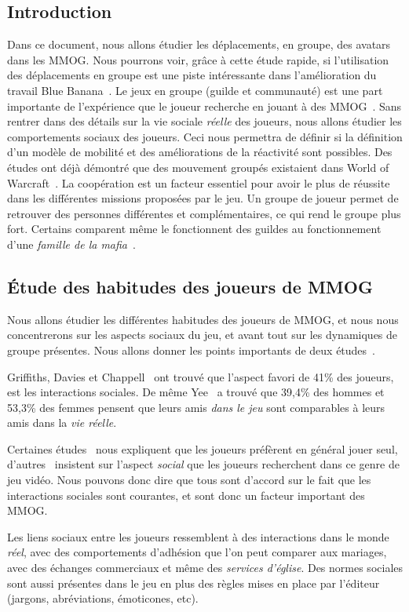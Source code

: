 
\subsection{Introduction}
Dans ce document, nous allons étudier les déplacements, en groupe, des avatars dans les MMOG. Nous pourrons voir, grâce à cette étude rapide, si l'utilisation des déplacements en groupe est une piste intéressante dans l'amélioration du travail Blue Banana~\cite{191}. Le jeux en groupe (guilde et communauté) est une part importante de l'expérience que le joueur recherche en jouant à des MMOG~\cite{1501834,1255052}. Sans rentrer dans des détails sur la vie sociale \textit{réelle} des joueurs, nous allons étudier les comportements sociaux des joueurs. Ceci nous permettra de définir si la définition d'un modèle de mobilité et des améliorations de la réactivité sont possibles. Des études ont déjà démontré que des mouvement groupés existaient dans World of Warcraft~\cite{15141312}. La coopération est un facteur essentiel pour avoir le plus de réussite  dans les différentes missions proposées par le jeu. Un groupe de joueur permet de retrouver des personnes différentes et complémentaires, ce qui rend le groupe plus fort. Certains comparent même le fonctionnent des guildes au fonctionnement d'une \textit{famille de la mafia}~\cite{Jakobsson03thesopranos}.


\subsection{Étude des habitudes des joueurs de MMOG}
Nous allons étudier les différentes habitudes des joueurs de MMOG, et nous nous concentrerons sur les aspects sociaux du jeu, et avant tout sur les dynamiques de groupe présentes. Nous allons donner les points importants de deux études~\cite{1255052,StudyEQ}.


Griffiths, Davies et Chappell~\cite{BreakingSteretype} ont trouvé que l'aspect favori de 41\% des joueurs, est les interactions sociales. De même Yee~\cite{1159988} a trouvé que 39,4\% des hommes et 53,3\% des femmes pensent que leurs amis \textit{dans le jeu} sont comparables à leurs amis dans la \textit{vie réelle}.
\par Certaines études~\cite{1124834,1031667} nous expliquent que les joueurs préfèrent en général jouer seul, d'autres~\cite{1159988,Jakobsson03thesopranos} insistent sur l'aspect \textit{social} que les joueurs recherchent dans ce genre de jeu vidéo. Nous pouvons donc dire que tous sont d'accord sur le fait que les interactions sociales sont courantes, et sont donc un facteur important des MMOG.
\par Les liens sociaux entre les joueurs ressemblent à des interactions dans le monde \textit{réel}, avec des comportements d'adhésion que l'on peut comparer aux mariages, avec des échanges commerciaux et même des \textit{services d'église}. Des normes sociales sont aussi présentes dans le jeu en plus des règles mises en place par l'éditeur (jargons, abréviations, émoticones, etc).

